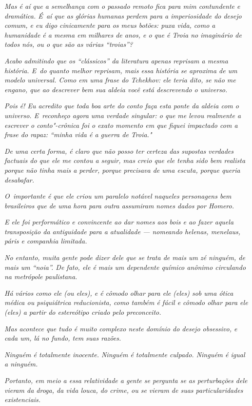 \emph{Mas é aí que a semelhança com o passado remoto fica para mim
contundente e dramática. É~aí que as glórias humanas perdem para a
imperiosidade do desejo comum, e eu digo cinicamente para os meus
botões: puxa vida, como a humanidade é a mesma em milhares de anos, e o
que é Troia no imaginário de todos nós, ou o que são as várias
``troias''?}~

\emph{Acabo admitindo que os ``clássicos'' da literatura apenas reprisam
a mesma história. E~do quanto melhor reprisam, mais essa história se
aproxima de um modelo universal. Como em uma frase do Tchekhov: ele teria
dito, se não me engano, que ao descrever bem sua aldeia você está
descrevendo o universo.}~

\emph{Pois é! Eu acredito que toda boa arte do conto faça esta ponte da
aldeia com o universo. E~reconheço agora uma verdade singular: o que me
levou realmente a escrever o conto"-crônica foi o exato momento em que
fiquei impactado com a frase do rapaz: ``minha vida é a guerra de
Troia."}~

\emph{De uma certa forma, é claro que não posso ter certeza das supostas
verdades factuais do que ele me contou a seguir, mas creio que ele tenha
sido bem realista porque não tinha mais a perder, porque precisava de
uma escuta, porque queria desabafar.}~

\emph{O~importante é que ele criou um paralelo notável naqueles
personagens bem brasileiros que de uma hora para outra assumiram nomes
dados por Homero.}~

\emph{E ele foi performático e convincente ao dar nomes aos bois e ao
fazer aquela transposição da antiguidade para a atualidade --- nomeando
helenas, menelaus, páris e companhia limitada.}~

\emph{No entanto, muita gente pode dizer dele que se trata de mais um zé
ninguém, de mais um ``noia''. De fato, ele é mais um dependente químico
anônimo circulando na metrópole paulistana.}~

\emph{Há vários como ele (ou eles), e é cômodo olhar para ele (eles) sob
uma ótica médica ou psiquiátrica reducionista, como também é fácil e
cômodo olhar para ele (eles) a partir do estereótipo criado pelo
preconceito.}~

\emph{Mas acontece que tudo é muito complexo neste domínio do desejo
obsessivo, e cada um, lá no fundo, tem suas razões.}~

\emph{Ninguém é totalmente inocente. Ninguém é totalmente culpado.
Ninguém é igual a ninguém.}~

\emph{Portanto, em meio a essa relatividade a gente se pergunta se as
perturbações dele vieram da droga, da vida louca, do crime, ou se vieram
de suas particularidades existenciais.}~

